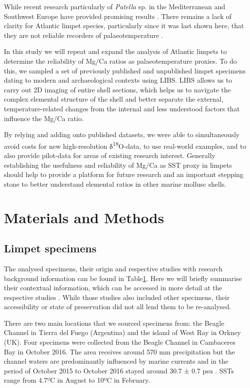 \documentclass[
  authoryear,
  preprint,
  3p]{elsarticle}
\begin{document}
While recent research particularly of \emph{Patella} sp. in the
Mediterranean and Southwest Europe have provided promising results
\citep{Hausmann2019-fi, Garcia-Escarzaga2015-jc, Garcia-Escarzaga2018-nf}.
There remains a lack of clarity for Atlantic limpet species,
particularly since it was last shown here, that they are not reliable
recorders of palaeotemperature \citep{Graniero2015-zv}.

In this study we will repeat and expand the analysis of Atlantic limpets
to determine the reliability of Mg/Ca ratios as palaeotemperature
proxies. To do this, we sampled a set of previously published and
unpublished limpet specimens dating to modern and archaeological
contexts using LIBS. LIBS allows us to carry out 2D imaging of entire
shell sections, which helps us to navigate the complex elemental
structure of the shell and better separate the external,
temperature-related changes from the internal and less understood
factors that influence the Mg/Ca ratio.

By relying and adding onto published datasets, we were able to
simultaneously avoid costs for new high-resolution
δ\textsuperscript{18}O-data, to use real-world examples, and to also
provide pilot-data for areas of existing research interest. Generally
establishing the usefulness and reliability of Mg/Ca as SST proxy in
limpets should help to provide a platform for future research and an
important stepping stone to better understand elemental ratios in other
marine mollusc shells.

\section{Materials and Methods}\label{Methods}

\subsection{Limpet specimens}\label{limpet-specimens}

The analysed specimens, their origin and respective studies with
research background information can be found in
Table\hyperref[Table_1]{1}. Here we will briefly summarise their
contextual information, which can be accessed in more detail at the
respective studies
\citep{Nicastro2020-ih, Surge2012-ba, Graniero2017-io}. While those
studies also included other specimens, their accessibility or state of
preservation did not all lend them to be re-analysed.

There are two main locations that we sourced specimens from: the Beagle
Channel in Tierra del Fuego (Argentina) and the island of West Ray in
Orkney (UK). Four specimens were collected from the Beagle Channel in
Cambaceres Bay in October 2016. The area receives around 570 mm
precipitation but the channel waters are predominantly influenced by
marine currents and in the period of October 2015 to October 2016 stayed
around 30.7 ± 0.7 psu \citep{Nicastro2020-ih}. SSTs range from 4.7ºC in
August to 10ºC in February.
\end{document}
